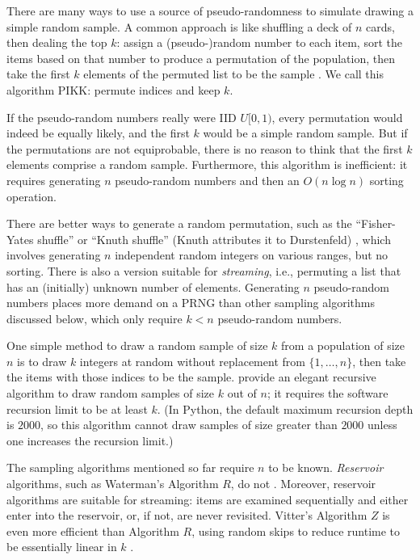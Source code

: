 \documentclass[graybox]{svmult}
\begin{document}
There are many ways to use a source of pseudo-randomness to simulate drawing a simple random sample. 
A common approach is like shuffling a deck of $n$ cards, then dealing the top $k$:
assign a (pseudo-)random number to each item, sort the items based on that number
to produce a permutation of the population, 
then take the first $k$ elements of the permuted list to be the sample
\cite{stine_statistics_2014, leblanc_statistics_2004, dahlberg_practical_2010}.
We call this algorithm PIKK: permute indices and keep $k$.

If the pseudo-random numbers really were IID $U[0,1)$,  every permutation would indeed be equally likely, 
and the first $k$ would be a simple random sample.
But if the permutations are not equiprobable, there is no reason to think that the first $k$ 
elements comprise a random sample. 
Furthermore, this algorithm is inefficient: it requires generating 
$n$ pseudo-random numbers and then an $O(n\log n)$ sorting operation.

There are better ways to generate a random permutation, such as the ``Fisher-Yates shuffle'' or ``Knuth shuffle'' (Knuth attributes it to Durstenfeld) \cite{knuth_art_1997},
which involves generating $n$ independent random integers on various ranges, but no sorting.
There is also a version suitable for \emph{streaming}, i.e., permuting a list that has an (initially) unknown number of elements.
Generating $n$ pseudo-random numbers places more demand on a PRNG than other sampling algorithms discussed below, which only require $k<n$ pseudo-random numbers.

One simple method to draw a random sample of size $k$ from a population of size $n$
is to draw $k$ integers at random without replacement from  $\{1, \ldots, n\}$, then take the items with those indices to be the sample.
\cite{cormen_introduction_2009} provide an elegant recursive algorithm to draw random samples of size $k$ out of $n$; it requires the software recursion limit to be at least $k$.
(In Python, the default maximum recursion depth is $2000$, so this algorithm cannot draw samples of size greater than $2000$ unless one increases the recursion limit.)

The sampling algorithms mentioned so far require $n$ to be known.
\emph{Reservoir} algorithms, such as Waterman's Algorithm $R$, do not  \cite{knuth_art_1997}.
Moreover, reservoir algorithms are suitable for streaming: items are examined
sequentially and either enter into the reservoir, or, if not, are never revisited.
Vitter's Algorithm $Z$ is even more efficient than Algorithm $R$,
using random skips to reduce runtime to be essentially linear in $k$ \cite{vitter_random_1985}.
\end{document}
